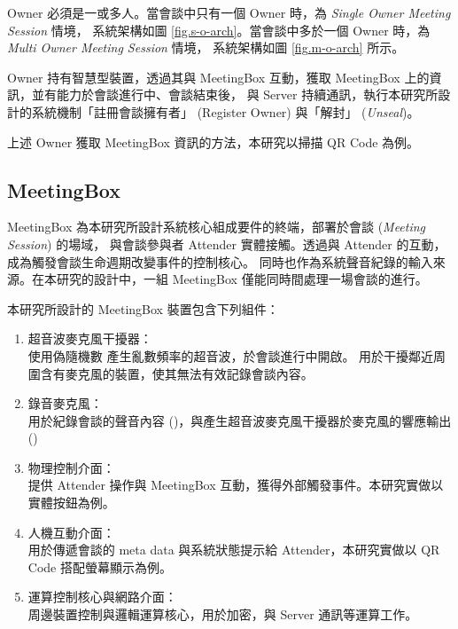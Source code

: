     Owner 必須是一或多人。當會談中只有一個 Owner 時，為 {\it Single Owner Meeting Session} 情境，
系統架構如圖 \ref{fig.s-o-arch}。當會談中多於一個 Owner 時，為 {\it Multi Owner Meeting Session} 情境，
系統架構如圖 \ref{fig.m-o-arch} 所示。

    Owner 持有智慧型裝置，透過其與 MeetingBox 互動，獲取 MeetingBox 上的資訊，並有能力於會談進行中、會談結束後，
與 Server 持續通訊，執行本研究所設計的系統機制「註冊會談擁有者」 (Register Owner) 與「解封」 ({\it Unseal})。

    上述 Owner 獲取 MeetingBox 資訊的方法，本研究以掃描 QR Code 為例。


\subsection{MeetingBox}

    MeetingBox 為本研究所設計系統核心組成要件的終端，部署於會談 ({\it Meeting Session}) 的場域，
與會談參與者 Attender 實體接觸。透過與 Attender 的互動，成為觸發會談生命週期改變事件的控制核心。
同時也作為系統聲音紀錄的輸入來源。在本研究的設計中，一組 MeetingBox 僅能同時間處理一場會談的進行。

    本研究所設計的 MeetingBox 裝置包含下列組件：

    \begin{enumerate}
        \item 超音波麥克風干擾器：\\
            使用偽隨機數 \DEFfuncPRNG 產生亂數頻率的超音波，於會談進行中開啟。
            用於干擾鄰近周圍含有麥克風的裝置，使其無法有效記錄會談內容。

        \item 錄音麥克風：\\
            用於紀錄會談的聲音內容 (\DEFrecJ)，與產生超音波麥克風干擾器於麥克風的響應輸出 (\DEFrecN)

        \item 物理控制介面：\\
            提供 Attender 操作與 MeetingBox 互動，獲得外部觸發事件。本研究實做以實體按鈕為例。

        \item 人機互動介面：\\
            用於傳遞會談的 meta data 與系統狀態提示給 Attender，本研究實做以 QR Code 搭配螢幕顯示為例。

        \item 運算控制核心與網路介面：\\
            周邊裝置控制與邏輯運算核心，用於加密，與 Server 通訊等運算工作。
    \end{enumerate}


